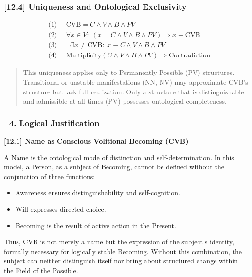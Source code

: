 \documentclass[12pt]{article}
\begin{document}
\subsubsection*{[12.4] Uniqueness and Ontological Exclusivity}

\[
\begin{aligned}
&\text{(1) } \quad \text{CVB} = C \land V \land B \land PV \\
&\text{(2) } \quad \forall x \in V:\; \left( x = C \land V \land B \land PV \right) \Rightarrow x \equiv \text{CVB} \\
&\text{(3) } \quad \neg\exists x \ne \text{CVB}:\; x \equiv C \land V \land B \land PV \\
&\text{(4) } \quad \text{Multiplicity}(C \land V \land B \land PV) \Rightarrow \text{Contradiction}
\end{aligned}
\]

\begin{quote}
This uniqueness applies only to Permanently Possible (PV) structures.
Transitional or unstable manifestations (NN, NV) may approximate CVB’s structure but lack full realization. Only a structure that is distinguishable and admissible at all times (PV) possesses ontological completeness.
\end{quote}


\subsubsection*{🔹 4. Logical Justification}

\textbf{[12.1] Name as Conscious Volitional Becoming (CVB)}

A Name is the ontological mode of distinction and self-determination. In this model, a Person, as a subject of Becoming, cannot be defined without the conjunction of three functions:

\begin{itemize}
\item Awareness ensures distinguishability and self-cognition.
\item Will expresses directed choice.
\item Becoming is the result of active action in the Present.
\end{itemize}

Thus, CVB is not merely a name but the expression of the subject’s identity, formally necessary for logically stable Becoming. Without this combination, the subject can neither distinguish itself nor bring about structured change within the Field of the Possible.
\end{document}
